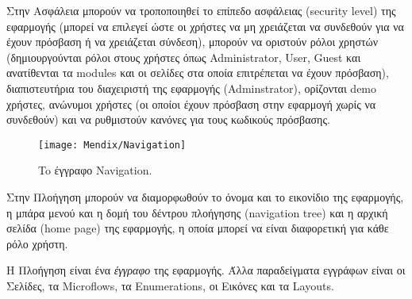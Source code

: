         Στην Ασφάλεια μπορούν να τροποποιηθεί το επίπεδο ασφάλειας (security level) της εφαρμογής (μπορεί να επιλεγεί ώστε οι χρήστες να μη χρειάζεται να συνδεθούν για να έχουν πρόσβαση ή να χρειάζεται σύνδεση), μπορούν να οριστούν ρόλοι χρηστών (δημιουργούνται ρόλοι στους χρήστες όπως Administrator, User, Guest και ανατίθενται τα modules και οι σελίδες στα οποία επιτρέπεται να έχουν πρόσβαση), διαπιστευτήρια του διαχειριστή της εφαρμογής (Adminstrator), ορίζονται demo χρήστες, ανώνυμοι χρήστες (οι οποίοι έχουν πρόσβαση στην εφαρμογή χωρίς να συνδεθούν) και να ρυθμιστούν κανόνες για τους κωδικούς πρόσβασης.

        \begin{figure}[h!] \noindent \centering
                \texttt{[image: Mendix/Navigation]}
                \caption{\centering To έγγραφο Navigation.}
        \end{figure}

        Στην Πλοήγηση μπορούν να διαμορφωθούν το όνομα και το εικονίδιο της εφαρμογής, η μπάρα μενού και η δομή του δέντρου πλοήγησης (navigation tree) και η αρχική σελίδα (home page) της εφαρμογής, η οποία μπορεί να είναι διαφορετική για κάθε ρόλο χρήστη.

        Η Πλοήγηση είναι ένα \textit{έγγραφο} της εφαρμογής. Άλλα παραδείγματα εγγράφων είναι οι Σελίδες, τα Microflows, τα Enumerations, οι Εικόνες και τα Layouts.

